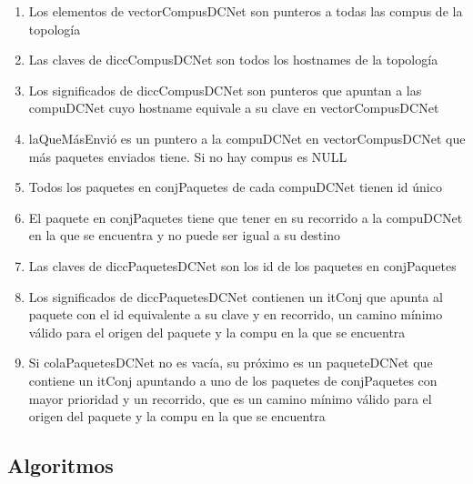 \begin{enumerate}
	\item Los elementos de vectorCompusDCNet son punteros a todas las compus de
		la topología
	\item Las claves de diccCompusDCNet son todos los hostnames de la topología
	\item Los significados de diccCompusDCNet son punteros que apuntan a las
		compuDCNet cuyo hostname equivale a su clave en vectorCompusDCNet
	\item laQueMásEnvió es un puntero a la compuDCNet en vectorCompusDCNet que
		más paquetes enviados tiene. Si no hay compus es NULL
	\item Todos los paquetes en conjPaquetes de cada compuDCNet tienen id único
	\item El paquete en conjPaquetes tiene que tener en su recorrido a la
		compuDCNet en la que se encuentra y no puede ser igual a su destino
	\item Las claves de diccPaquetesDCNet son los id de los paquetes en
		conjPaquetes 
	\item Los significados de diccPaquetesDCNet contienen un itConj que apunta al
		paquete con el id equivalente a su clave y en recorrido, un camino
		mínimo válido para el origen del paquete y la compu en la que se
		encuentra
	\item Si colaPaquetesDCNet no es vacía, su próximo es un paqueteDCNet que
		contiene un itConj apuntando a uno de los paquetes de conjPaquetes con
		mayor prioridad y un recorrido, que es un camino mínimo válido para el
		origen del paquete y la compu en la que se encuentra
\end{enumerate}

\subsection{Algoritmos}

\lstset{style=alg}

